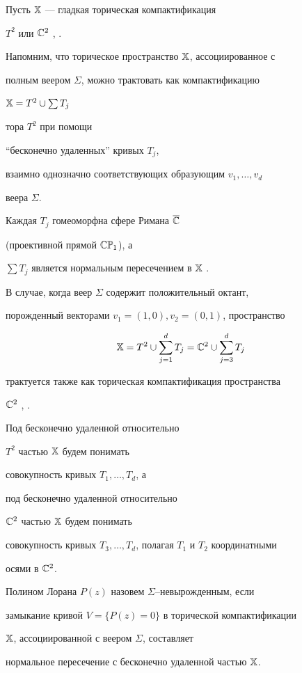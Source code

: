 Пусть $\Bbb X$ --- гладкая торическая компактификация


$T^2$ или $\Bbb C^2$ \cite{H1}, \cite{Fu}.


Напомним, что торическое пространство $\Bbb X$, ассоциированное с


полным веером $\Sigma$, можно трактовать как компактификацию


$\Bbb X=T^2\cup\sum T_j$


тора $T^2$ при помощи


``бесконечно удаленных'' кривых $T_j$,


взаимно однозначно соответствующих образующим $v_1,\dotsc,v_d$


веера $\Sigma$.


Каждая $T_j$ гомеоморфна сфере Римана $\overline{\Bbb C}$


(проективной прямой $\Bbb{CP}_1$), а


$\sum T_j$ является нормальным пересечением в $\Bbb X$ \cite{H1}.


В случае, ког\-да веер $\Sigma$ содержит положительный октант,


порожденный векторами $v_{1}=(1,0), v_{2}=(0,1)$, пространство


$$


\Bbb X=T^2\cup\sum\limits_{j=1}^{d} T_j


=\Bbb C^2\cup\sum\limits_{j=3}^{d} T_j


$$


трактуется также как торическая компактификация пространства


$\Bbb C^2$ \cite{H1}, \cite{1}.


Под бесконечно удаленной относительно


$T^2$ частью $\Bbb X$ будем понимать


совокупность кривых $T_1,\dots,T_d$, а


под бесконечно удаленной относительно


$\Bbb C^2$ частью $\Bbb X$ будем понимать


совокупность кривых $T_3,\dotsc,T_d$, полагая $T_1$ и $T_2$ координатными


осями в $\Bbb C^2$.





\begin{defnnonum}


Полином Лорана $P(z)$ назовем $\Sigma$--невырожденным, если


замыкание кривой $V=\{P(z)=0\}$ в торической компактификации


$\Bbb X$, ассоциированной с веером $\Sigma$, составляет


нормальное пересечение с бесконечно удаленной частью $\Bbb X$.


\end{defnnonum}





